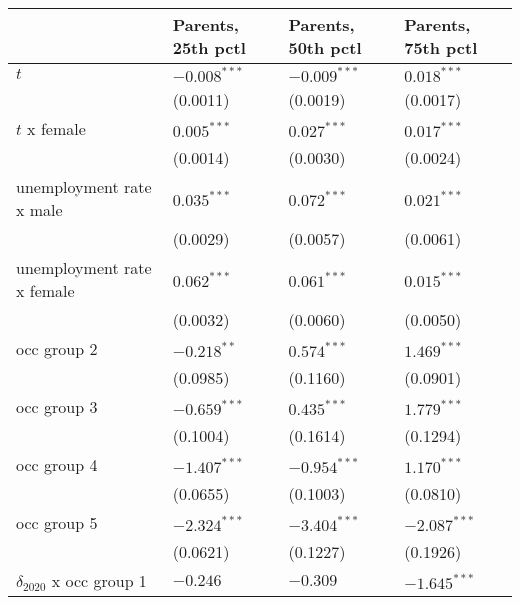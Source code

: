 \begin{tabular}{llll}
\toprule
{} & Parents, 25th pctl & Parents, 50th pctl & Parents, 75th pctl \\
\midrule
$t$                                    &     $-0.008^{***}$ &     $-0.009^{***}$ &      $0.018^{***}$ \\
                                       &           (0.0011) &           (0.0019) &           (0.0017) \\
$t$ x female                           &      $0.005^{***}$ &      $0.027^{***}$ &      $0.017^{***}$ \\
                                       &           (0.0014) &           (0.0030) &           (0.0024) \\
unemployment rate x male               &      $0.035^{***}$ &      $0.072^{***}$ &      $0.021^{***}$ \\
                                       &           (0.0029) &           (0.0057) &           (0.0061) \\
unemployment rate x female             &      $0.062^{***}$ &      $0.061^{***}$ &      $0.015^{***}$ \\
                                       &           (0.0032) &           (0.0060) &           (0.0050) \\
occ group 2                            &      $-0.218^{**}$ &      $0.574^{***}$ &      $1.469^{***}$ \\
                                       &           (0.0985) &           (0.1160) &           (0.0901) \\
occ group 3                            &     $-0.659^{***}$ &      $0.435^{***}$ &      $1.779^{***}$ \\
                                       &           (0.1004) &           (0.1614) &           (0.1294) \\
occ group 4                            &     $-1.407^{***}$ &     $-0.954^{***}$ &      $1.170^{***}$ \\
                                       &           (0.0655) &           (0.1003) &           (0.0810) \\
occ group 5                            &     $-2.324^{***}$ &     $-3.404^{***}$ &     $-2.087^{***}$ \\
                                       &           (0.0621) &           (0.1227) &           (0.1926) \\
$\delta_{2020}$ x occ group 1          &           $-0.246$ &           $-0.309$ &     $-1.645^{***}$ \\

\end{tabular}
